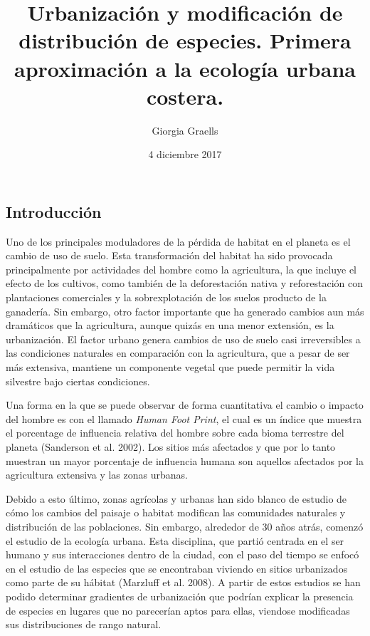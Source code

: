 \documentclass[]{article}
\title{Urbanización y modificación de distribución de especies. Primera
aproximación a la ecología urbana costera.}
\author{Giorgia Graells}
\date{4 diciembre 2017}
\begin{document}
\maketitle

\subsection{Introducción}\label{introduccion}

Uno de los principales moduladores de la pérdida de habitat en el
planeta es el cambio de uso de suelo. Esta transformación del habitat ha
sido provocada principalmente por actividades del hombre como la
agricultura, la que incluye el efecto de los cultivos, como también de
la deforestación nativa y reforestación con plantaciones comerciales y
la sobrexplotación de los suelos producto de la ganadería. Sin embargo,
otro factor importante que ha generado cambios aun más dramáticos que la
agricultura, aunque quizás en una menor extensión, es la urbanización.
El factor urbano genera cambios de uso de suelo casi irreversibles a las
condiciones naturales en comparación con la agricultura, que a pesar de
ser más extensiva, mantiene un componente vegetal que puede permitir la
vida silvestre bajo ciertas condiciones.

Una forma en la que se puede observar de forma cuantitativa el cambio o
impacto del hombre es con el llamado \emph{Human Foot Print}, el cual es
un índice que muestra el porcentage de influencia relativa del hombre
sobre cada bioma terrestre del planeta (Sanderson et al. 2002). Los
sitios más afectados y que por lo tanto muestran un mayor porcentaje de
influencia humana son aquellos afectados por la agricultura extensiva y
las zonas urbanas.

Debido a esto último, zonas agrícolas y urbanas han sido blanco de
estudio de cómo los cambios del paisaje o habitat modifican las
comunidades naturales y distribución de las poblaciones. Sin embargo,
alrededor de 30 años atrás, comenzó el estudio de la ecología urbana.
Esta disciplina, que partió centrada en el ser humano y sus
interacciones dentro de la ciudad, con el paso del tiempo se enfocó en
el estudio de las especies que se encontraban viviendo en sitios
urbanizados como parte de su hábitat (Marzluff et al. 2008). A partir de
estos estudios se han podido determinar gradientes de urbanización que
podrían explicar la presencia de especies en lugares que no parecerían
aptos para ellas, viendose modificadas sus distribuciones de rango
natural.
\end{document}
